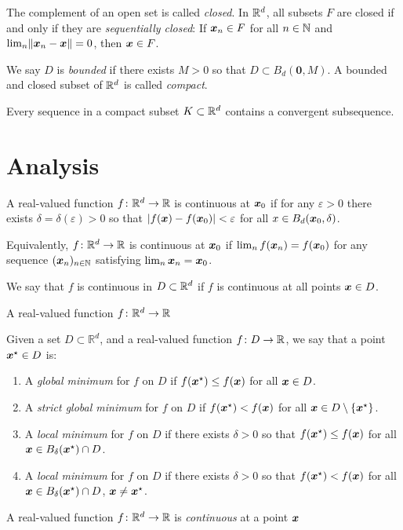 The complement of an open set is called \emph{closed}. In $\mathbb{R}^d$, all subsets $F$ are closed if and only if they are \emph{sequentially closed}: If $\boldsymbol{x}_n\in F$ for all $n \in \mathbb{N}$ and $\lim_n \lVert \boldsymbol{x}_n - \boldsymbol{x} \rVert = 0$, then $\boldsymbol{x} \in F$.

We say $D$ is \emph{bounded} if there exists $M>0$ so that $D \subset B_d(\boldsymbol{0}, M)$.  A bounded and closed subset of $\mathbb{R}^d$ is called \emph{compact}.

\begin{theorem}
Every sequence in a compact subset $K \subset \mathbb{R}^d$ contains a convergent subsequence.
\end{theorem}

\section{Analysis}

A real-valued function $f\colon \mathbb{R}^d \to \mathbb{R}$ is continuous at $\boldsymbol{x}_0$ if for any $\varepsilon>0$ there exists $\delta = \delta(\varepsilon)>0$ so that $\lvert f(\boldsymbol{x}) - f(\boldsymbol{x}_0) \rvert < \varepsilon$ for all $x \in B_d(\boldsymbol{x}_0, \delta)$.

Equivalently, $f\colon \mathbb{R}^d \to \mathbb{R}$ is continuous at $\boldsymbol{x}_0$ if $\lim_n f(\boldsymbol{x}_n) = f(\boldsymbol{x}_0)$ for any sequence $({\boldsymbol{x}}_{n})_{{n}\in\mathbb{N}}$ satisfying $\lim_n \boldsymbol{x}_n = \boldsymbol{x}_0$.  

We say that $f$ is continuous in $D \subset \mathbb{R}^d$ if $f$ is continuous at all points $\boldsymbol{x} \in D$.

A real-valued function $f\colon \mathbb{R}^d \to \mathbb{R}$



Given a set $D \subset \mathbb{R}^d$, and a real-valued function $f\colon D \to \mathbb{R}$, we say that a point $\boldsymbol{x}^{\star} \in D$ is:
\begin{enumerate}
	\item A \emph{global minimum} for $f$ on $D$ if $f(\boldsymbol{x}^{\star}) \leq f(\boldsymbol{x})$ for all $\boldsymbol{x} \in D$.
	\item A \emph{strict global minimum} for $f$ on $D$ if $f(\boldsymbol{x}^{\star}) < f(\boldsymbol{x})$ for all $\boldsymbol{x} \in D \setminus \{ \boldsymbol{x}^{\star} \}$.
	\item A \emph{local minimum} for $f$ on $D$ if there exists $\delta>0$ so that  $f(\boldsymbol{x}^{\star}) \leq f(\boldsymbol{x})$ for all $\boldsymbol{x} \in B_\delta(\boldsymbol{x}^{\star})\cap D$.
	\item A \emph{local minimum} for $f$ on $D$ if there exists $\delta>0$ so that  $f(\boldsymbol{x}^{\star}) < f(\boldsymbol{x})$ for all $\boldsymbol{x} \in B_\delta(\boldsymbol{x}^{\star})\cap D$, $\boldsymbol{x} \neq \boldsymbol{x}^{\star}$.
\end{enumerate}

A real-valued function $f\colon \mathbb{R}^d \to \mathbb{R}$ is \emph{continuous} at a point $\boldsymbol{x}$ 



